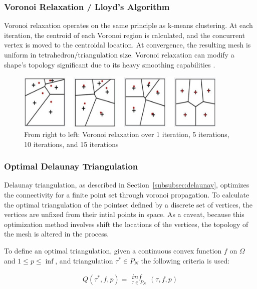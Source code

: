 \documentclass[12pt]{drexelthesis}
\let\Oldsubsubsection\subsubsection
\renewcommand{\subsubsection}{\FloatBarrier\Oldsubsubsection}
\begin{document}
\subsubsection{Voronoi Relaxation / Lloyd's Algorithm}
\label{optimization:voronoirelaxation}

Voronoi  relaxation  operates  on  the  same  principle  as  k-means  clustering.  At  each  iteration,  the  centroid  of  each  Voronoi  region  is  calculated,  and  the  concurrent  vertex  is  moved  to  the  centroidal  location.  At  convergence,  the  resulting  mesh  is  uniform  in  tetrahedron/triangulation  size.  Voronoi  relaxation  can  modify  a  shape’s  topology  significant  due  to  its  heavy  smoothing  capabilities  \cite{RN61}.

\begin{figure}[!ht]
	\centering
		\includegraphics[width=4in]{voronoirelaxation.PNG}
		\caption[Demonstration of voronoi relaxation over several iterations]
		{\centering From right to left: Voronoi relaxation over 1 iteration, 5 iterations, 10 iterations, and 15 iterations}
		\label{fig:voronoirelaxation}
\end{figure}

\subsubsection{Optimal Delaunay Triangulation}
Delaunay triangulation, as described in Section~\ref{subsubsec:delaunay}, optimizes the connectivity for a finite point set through voronoi propagation. To calculate the optimal triangulation of the pointset defined by a discrete set of vertices, the vertices are unfixed from their intial points in space. As a caveat, because this optimization method involves shift the locations of the vertices, the topology of the mesh is altered in the process.

To define an optimal triangulation, given a continuous convex function $f$ on $\Omega$ and $1 \leq p \leq \inf$, and triangulation $\tau^{\ast} \in P_{N}$  the following criteria is used:

\begin{equation}
	Q ( \tau^{\ast}  , f, p) = \substack{inf \\ _{\tau \in P_{N}} } (\tau , f, p)
\end{equation}
\end{document}
